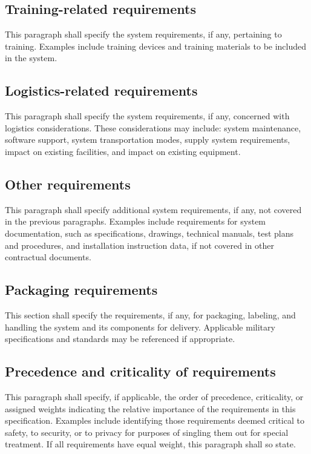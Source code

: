 \subsection{Training-related requirements}

This paragraph shall specify the system requirements, if any, pertaining
to training. Examples include training devices and training materials to
be included in the system.

\subsection{Logistics-related requirements}

This paragraph shall specify the system requirements, if any, concerned
with logistics considerations. These considerations may include: system
maintenance, software support, system transportation modes, supply
system requirements, impact on existing facilities, and impact on
existing equipment.

\subsection{Other requirements}

This paragraph shall specify additional system requirements, if any, not
covered in the previous paragraphs. Examples include requirements for
system documentation, such as specifications, drawings, technical
manuals, test plans and procedures, and installation instruction data,
if not covered in other contractual documents.

\subsection{Packaging requirements}

This section shall specify the requirements, if any, for packaging,
labeling, and handling the system and its components for delivery.
Applicable military specifications and standards may be referenced if
appropriate.

\subsection{Precedence and criticality of requirements}

This paragraph shall specify, if applicable, the order of precedence,
criticality, or assigned weights indicating the relative importance of
the requirements in this specification. Examples include identifying
those requirements deemed critical to safety, to security, or to privacy
for purposes of singling them out for special treatment. If all
requirements have equal weight, this paragraph shall so state.

